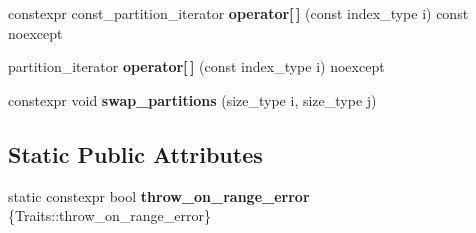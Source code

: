 \begin{DoxyCompactItemize}
$$constexpr const\+\_\+partition\+\_\+iterator {\bfseries operator\mbox{[}$\,$\mbox{]}} (const index\+\_\+type i) const noexcept
\item 
\mbox{\label{classsequoia_1_1data__structures_1_1contiguous__storage__base_ac8ae088437b27e4c5f76cc639df42e7c}} 
partition\+\_\+iterator {\bfseries operator\mbox{[}$\,$\mbox{]}} (const index\+\_\+type i) noexcept
\item 
\mbox{\label{classsequoia_1_1data__structures_1_1contiguous__storage__base_a09f68f2d9aed0f7e94636bbb693fc4a8}} 
constexpr void {\bfseries swap\+\_\+partitions} (size\+\_\+type i, size\+\_\+type j)
\end{DoxyCompactItemize}
\subsection*{Static Public Attributes}
\begin{DoxyCompactItemize}
\item 
\mbox{\label{classsequoia_1_1data__structures_1_1contiguous__storage__base_af7145537d744fe5945bf2be5cebbaeaf}} 
static constexpr bool {\bfseries throw\+\_\+on\+\_\+range\+\_\+error} \{Traits\+::throw\+\_\+on\+\_\+range\+\_\+error\}
\end{DoxyCompactItemize}
